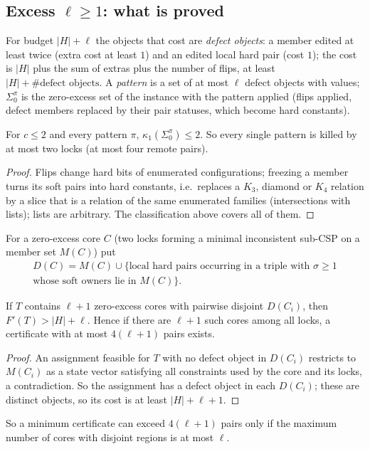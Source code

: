 \subsection{Excess \texorpdfstring{$\ell\ge1$}{l>=1}: what is proved}
For budget $|H|+\ell$ the objects that cost are \emph{defect objects}: a member edited at least twice (extra cost at least $1$) and an edited local hard pair (cost $1$); the cost is $|H|$ plus the sum of extras plus the number of flips, at least $|H|+\#\text{defect objects}$. A \emph{pattern} is a set of at most $\ell$ defect objects with values; $\Sigma_0^\pi$ is the zero-excess set of the instance with the pattern applied (flips applied, defect members replaced by their pair statuses, which become hard constants).
\begin{lemma}\label{lem:mcP}
For $c\le2$ and every pattern $\pi$, $\kappa_1(\Sigma_0^\pi)\le2$. So every single pattern is killed by at most two locks (at most four remote pairs).
\end{lemma}
\begin{proof}
Flips change hard bits of enumerated configurations; freezing a member turns its soft pairs into hard constants, i.e.\ replaces a $K_3$, diamond or $K_4$ relation by a slice that is a relation of the same enumerated families (intersections with lists); lists are arbitrary. The classification above covers all of them.
\end{proof}
For a zero-excess core $C$ (two locks forming a minimal inconsistent sub-CSP on a member set $M(C)$) put
\[\begin{gathered}D(C)=M(C)\cup\{\text{local hard pairs occurring in a triple with }\sigma\ge1\\ \text{whose soft owners lie in }M(C)\}.\end{gathered}\]
\begin{lemma}\label{lem:mcD}
If $T$ contains $\ell+1$ zero-excess cores with pairwise disjoint $D(C_i)$, then $F'(T)>|H|+\ell$. Hence if there are $\ell+1$ such cores among all locks, a certificate with at most $4(\ell+1)$ pairs exists.
\end{lemma}
\begin{proof}
An assignment feasible for $T$ with no defect object in $D(C_i)$ restricts to $M(C_i)$ as a state vector satisfying all constraints used by the core and its locks, a contradiction. So the assignment has a defect object in each $D(C_i)$; these are distinct objects, so its cost is at least $|H|+\ell+1$.
\end{proof}
So a minimum certificate can exceed $4(\ell+1)$ pairs only if the maximum number of cores with disjoint regions is at most $\ell$.


